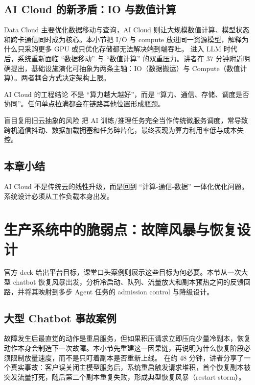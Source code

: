 \documentclass[a4paper]{article}
\begin{document}
\subsection{AI Cloud 的新矛盾：IO 与数值计算}
Data Cloud 主要优化数据移动与查询，AI Cloud 则让大规模数值计算、模型状态和跨卡通信同时成为核心。本小节把 I/O 与 compute 放进同一资源模型，解释为什么只采购更多 GPU 或只优化存储都无法解决端到端吞吐。
进入 LLM 时代后，系统重新面临 ``数据移动'' 与 ``数值计算'' 的双重压力。讲者在 37 分钟附近明确提出，基础设施演化可抽象为两条主轴：IO（数据搬运）与 Compute（数值计算）。两者耦合方式决定架构上限。

\begin{importantbox}{AI Cloud 的工程结论}
不是 ``算力越大越好''，而是 ``算力、通信、存储、调度是否协同''。任何单点拉满都会在链路其他位置形成瓶颈。
\end{importantbox}

\begin{warningbox}{盲目复用旧云抽象的风险}
把 AI 训练/推理任务完全当作传统微服务调度，常导致跨机通信抖动、数据加载拥塞和任务碎片化，最终表现为算力利用率低与成本失控。
\end{warningbox}

\subsection{本章小结}
AI Cloud 不是传统云的线性升级，而是回到 ``计算-通信-数据'' 一体化优化问题。系统设计必须从工作负载本身出发。

\section{生产系统中的脆弱点：故障风暴与恢复设计}

官方 deck 给出平台目标，课堂口头案例则展示这些目标为何必要。本节从一次大型 chatbot 恢复风暴出发，分析冷启动、队列、流量放大和副本预热之间的反馈回路，并将其映射到多步 Agent 任务的 admission control 与降级设计。

\subsection{大型 Chatbot 事故案例}
故障发生后最直觉的动作是重启服务，但如果积压请求立即压向少量冷副本，恢复动作本身会制造下一次故障。本小节先重建这一因果链，再说明为什么恢复阶段必须限制放量速度，而不是只盯着副本是否重新上线。
在约 48 分钟，讲者分享了一个真实事故：客户误关闭主模型服务后，系统重启触发请求堆积，首个恢复副本被突发流量打死，随后第二个副本重复失败，形成典型恢复风暴（restart storm）。
\end{document}
